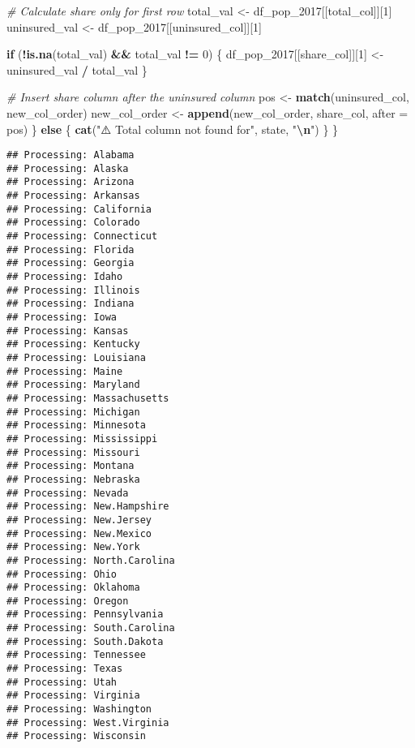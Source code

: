 \documentclass[
]{article}
\newenvironment{Shaded}{\begin{snugshade}}{\end{snugshade}}
\newcommand{\AttributeTok}[1]{\textcolor[rgb]{0.13,0.29,0.53}{#1}}
\newcommand{\CommentTok}[1]{\textcolor[rgb]{0.56,0.35,0.01}{\textit{#1}}}
\newcommand{\ControlFlowTok}[1]{\textcolor[rgb]{0.13,0.29,0.53}{\textbf{#1}}}
\newcommand{\DecValTok}[1]{\textcolor[rgb]{0.00,0.00,0.81}{#1}}
\newcommand{\FunctionTok}[1]{\textcolor[rgb]{0.13,0.29,0.53}{\textbf{#1}}}
\newcommand{\NormalTok}[1]{#1}
\newcommand{\OtherTok}[1]{\textcolor[rgb]{0.56,0.35,0.01}{#1}}
\newcommand{\SpecialCharTok}[1]{\textcolor[rgb]{0.81,0.36,0.00}{\textbf{#1}}}
\newcommand{\StringTok}[1]{\textcolor[rgb]{0.31,0.60,0.02}{#1}}
\begin{document}
\begin{Shaded}
\begin{Highlighting}[]
    \CommentTok{\# Calculate share only for first row}
\NormalTok{    total\_val }\OtherTok{\textless{}{-}}\NormalTok{ df\_pop\_2017[[total\_col]][}\DecValTok{1}\NormalTok{]}
\NormalTok{    uninsured\_val }\OtherTok{\textless{}{-}}\NormalTok{ df\_pop\_2017[[uninsured\_col]][}\DecValTok{1}\NormalTok{]}
    
    \ControlFlowTok{if}\NormalTok{ (}\SpecialCharTok{!}\FunctionTok{is.na}\NormalTok{(total\_val) }\SpecialCharTok{\&\&}\NormalTok{ total\_val }\SpecialCharTok{!=} \DecValTok{0}\NormalTok{) \{}
\NormalTok{      df\_pop\_2017[[share\_col]][}\DecValTok{1}\NormalTok{] }\OtherTok{\textless{}{-}}\NormalTok{ uninsured\_val }\SpecialCharTok{/}\NormalTok{ total\_val}
\NormalTok{    \}}
    
    \CommentTok{\# Insert share column after the uninsured column}
\NormalTok{    pos }\OtherTok{\textless{}{-}} \FunctionTok{match}\NormalTok{(uninsured\_col, new\_col\_order)}
\NormalTok{    new\_col\_order }\OtherTok{\textless{}{-}} \FunctionTok{append}\NormalTok{(new\_col\_order, share\_col, }\AttributeTok{after =}\NormalTok{ pos)}
\NormalTok{  \} }\ControlFlowTok{else}\NormalTok{ \{}
    \FunctionTok{cat}\NormalTok{(}\StringTok{"⚠️ Total column not found for"}\NormalTok{, state, }\StringTok{"}\SpecialCharTok{\textbackslash{}n}\StringTok{"}\NormalTok{)}
\NormalTok{  \}}
\NormalTok{\}}
\end{Highlighting}
\end{Shaded}

\begin{verbatim}
## Processing: Alabama 
## Processing: Alaska 
## Processing: Arizona 
## Processing: Arkansas 
## Processing: California 
## Processing: Colorado 
## Processing: Connecticut 
## Processing: Florida 
## Processing: Georgia 
## Processing: Idaho 
## Processing: Illinois 
## Processing: Indiana 
## Processing: Iowa 
## Processing: Kansas 
## Processing: Kentucky 
## Processing: Louisiana 
## Processing: Maine 
## Processing: Maryland 
## Processing: Massachusetts 
## Processing: Michigan 
## Processing: Minnesota 
## Processing: Mississippi 
## Processing: Missouri 
## Processing: Montana 
## Processing: Nebraska 
## Processing: Nevada 
## Processing: New.Hampshire 
## Processing: New.Jersey 
## Processing: New.Mexico 
## Processing: New.York 
## Processing: North.Carolina 
## Processing: Ohio 
## Processing: Oklahoma 
## Processing: Oregon 
## Processing: Pennsylvania 
## Processing: South.Carolina 
## Processing: South.Dakota 
## Processing: Tennessee 
## Processing: Texas 
## Processing: Utah 
## Processing: Virginia 
## Processing: Washington 
## Processing: West.Virginia 
## Processing: Wisconsin
\end{verbatim}
\end{document}
